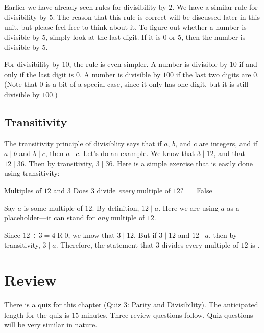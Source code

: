 \documentclass[a4paper,10pt]{report}
\begin{document}
Earlier we have already seen rules for divisibility by $2$. We have a similar
rule for divisibility by $5$. The reason that this rule is correct will be
discussed later in this unit, but please feel free to think about it. To figure
out whether a number is divisible by $5$, simply look at the last digit. If it
is $0$ or $5$, then the number is divisible by $5$.

For divisibility by $10$, the rule is even simpler. A number is divisible by
$10$ if and only if the last digit is $0$. A number is divisible by $100$ if the
last two digits are $0$. (Note that $0$ is a bit of a special case, since it
only has one digit, but it is still divisible by $100$.)

\subsection{Transitivity}

The \gls{transitivity} principle of divisiblity says that if $a$, $b$, and $c$
are integers, and if $a \mid b$ and $b \mid c$, then $a \mid c$. Let's do an
example. We know that $3 \mid 12$, and that $12 \mid 36$. Then by transitivity,
$3 \mid 36$. Here is a simple exercise that is easily done using transitivity:

\begin{problem}{Multiples of $12$ and $3$}
 Does $3$ divide \emph{every} multiple of $12$? \hfill {}~~~False

 \begin{solution}
  Say $a$ is some multiple of $12$. By definition, $12 \mid a$. Here we are
  using $a$ as a placeholder---it can stand for \emph{any} multiple of $12$.

  Since $12 \div 3 = 4 \operatorname{R} 0$, we know that $3 \mid 12$. But if $3
  \mid 12$ and $12 \mid a$, then by transitivity, $3 \mid a$. Therefore, the
  statement that $3$ divides every multiple of $12$ is .
 \end{solution}
\end{problem}

\section{Review}

There is a quiz for this chapter (Quiz 3: Parity and Divisibility). The
anticipated length for the quiz is $15$ minutes. Three review questions follow.
Quiz questions will be very similar in nature.
\end{document}
